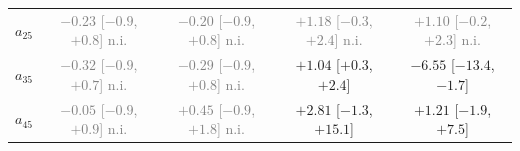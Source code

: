 \begin{tabular}{lcccc}
$a_{25}$ & \textcolor{gray}{$-0.23$ [$-0.9$, $+0.8$] n.i.} & \textcolor{gray}{$-0.20$ [$-0.9$, $+0.8$] n.i.} & \textcolor{gray}{$+1.18$ [$-0.3$, $+2.4$] n.i.} & \textcolor{gray}{$+1.10$ [$-0.2$, $+2.3$] n.i.}\\
$a_{35}$ & \textcolor{gray}{$-0.32$ [$-0.9$, $+0.7$] n.i.} & \textcolor{gray}{$-0.29$ [$-0.9$, $+0.8$] n.i.} & $+1.04$ [$+0.3$, $+2.4$] & $-6.55$ [$-13.4$, $-1.7$]\\
$a_{45}$ & \textcolor{gray}{$-0.05$ [$-0.9$, $+0.9$] n.i.} & \textcolor{gray}{$+0.45$ [$-0.9$, $+1.8$] n.i.} & $+2.81$ [$-1.3$, $+15.1$] & $+1.21$ [$-1.9$, $+7.5$]\\
\bottomrule\end{tabular}
